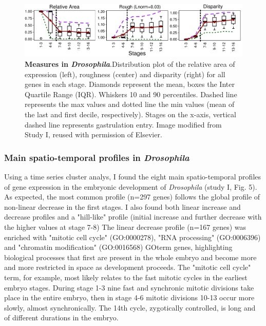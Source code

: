 \begin{figure}[b]
  \includegraphics[width=\textwidth]{./Images/Art-I/3_measures.png}
  \centering
  \caption{\textbf{Measures in \textit{Drosophila}}.Distribution plot of the relative area of expression (left), roughness (center) and disparity (right) for all genes in each stage. Diamonds represent the mean, boxes the Inter Quartile Range (IQR). Whiskers 10 and 90 percentiles. Dashed line represents the max values and dotted line the min values (mean of the last and first decile, respectively). Stages on the x-axis, vertical dashed line represents gastrulation entry. Image modified from Study I, reused with permission of Elsevier.
  }
  \label{fig:Art-I-3measures}
\end{figure}

\subsubsection{Main spatio-temporal profiles in \textit{Drosophila}}
Using a time series cluster analys, I found the eight main spatio-temporal profiles of gene expression in the embryonic development of \textit{Drosophila} (study I, Fig. 5). As expected, the most common profile (n=297 genes) follows the global profile of non-linear decrease in the first stages.
%
I also found both linear increase and decrease profiles and a "hill-like" profile (initial increase and further decrease with the higher values at stage 7-8)
%
The linear decrease profile (n=167 genes) was enriched with "mitotic cell cycle" (GO:0000278), "RNA processing" (GO:0006396) and "chromatin modification" (GO:0016568) GOterm genes, highlighting biological processes that first are present in the whole embryo and become more and more restricted in space as development proceeds.
The "mitotic cell cycle" term, for example, most likely relates to the fast mitotic cycles in the earliest embryo stages. During stage 1-3 nine fast and synchronic mitotic divisions take place in the entire embryo, then in stage 4-6 mitotic divisions 10-13 occur more slowly, almost synchronically. The 14th cycle, zygotically controlled, is long and of different durations in the embryo.

